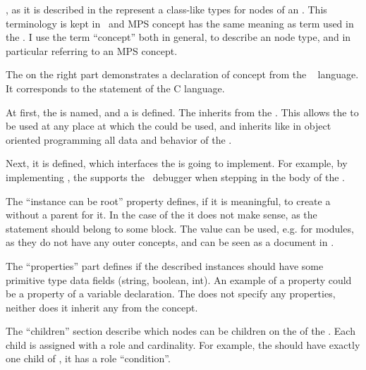 , as it is described in the  represent a class-like types for nodes of an . This terminology is kept in \jbmps\ and 
MPS concept has the same meaning as  term used in the . I use the term ``concept'' both in general, to describe an  node type,
and in particular referring to an MPS concept.

%

The  on the right part demonstrates a declaration of  concept from the \mbdr\  language.
It corresponds to the  statement of the C language.

At first, the  is named, and a  is defined. The   inherits from the  .
This allows the  to be used at any place at which the  could be used, and inherits like in object oriented programming
all data and behavior of the .

Next, it is defined, which interfaces the  is going to implement. For example, by implementing , the 
supports the \mbdr\ debugger when stepping in the body of the .

The ``instance can be root'' property defines, if it is meaningful, to create a  without a parent  for it. In the case
of the  it does not make sense, as the statement should belong to some block. The  value can be used, e.g. for modules,
as they do not have any outer concepts, and can be seen as a document in \jbmps.

The ``properties'' part defines if the described  instances should have some primitive type data fields (string, boolean, int).
An example of a property could be a  property of a variable declaration. The   does not specify any 
properties, neither does it inherit any from the  concept.

The ``children'' section describe which nodes can be children on the  of the . Each child is assigned with a role and cardinality. 
For example, the  should have exactly one child of  , it has a role ``condition''.

